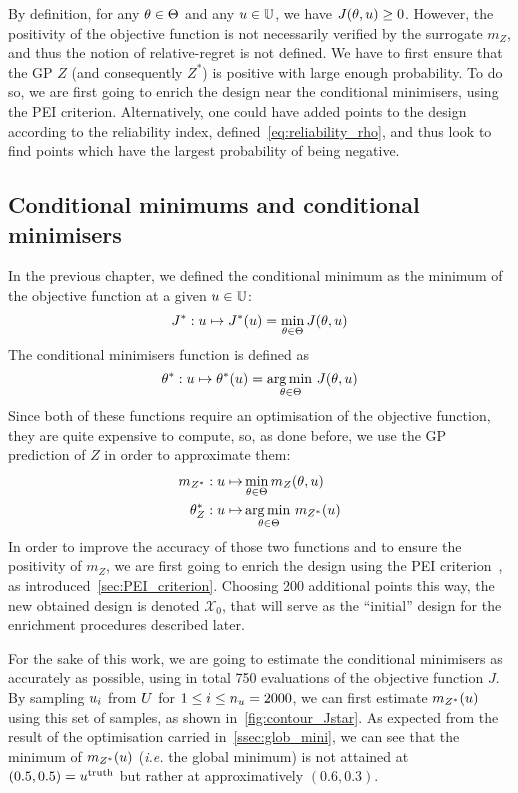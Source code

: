 \documentclass[../../Main_ManuscritThese.tex]{subfiles}
\begin{document}
By definition, for any $\theta\in \Theta$ and any $u \in \mathbb{U}$, we
have $J(\theta, u) \geq 0$.  However, the positivity of the objective
function is not necessarily verified by the surrogate $m_Z$, and thus
the notion of relative-regret is not defined. We have to first ensure
that the GP $Z$ (and consequently $Z^*$) is positive with large enough
probability.  To do so, we are first going to enrich the design near
the conditional minimisers, using the PEI criterion.  Alternatively,
one could have added points to the design according to the reliability
index, defined~\cref{eq:reliability_rho}, and thus look to find points
which have the largest probability of being negative.


\subsection{Conditional minimums and conditional minimisers}
\label{ssec:croco_cond_minimum_minimisers}

In the previous chapter, we defined the conditional minimum as the
minimum of the objective function at a given $u\in \mathbb{U}$:
\begin{equation}
  J^* : u \mapsto J^*(u) = \min_{\theta\in\Theta} J(\theta, u)
\end{equation}
The conditional minimisers function is defined as
\begin{equation}
  \theta^*:u  \mapsto \theta^*(u) = \operatorname*{arg\,min \,}_{\theta \in \Theta} J(\theta, u)
\end{equation}
Since both of these functions require an optimisation of the objective
function, they are quite expensive to compute, so, as done before, we
use the GP prediction of $Z$ in order to approximate them:
\begin{align}
  m_{Z^*}: u\mapsto &\min_{\theta \in \Theta} m_Z(\theta, u) \\
  \theta^*_{Z}: u  \mapsto &\operatorname*{arg\,min \,}_{\theta \in \Theta} m_{Z^*}(u)
\end{align}
In order to improve the accuracy of those two functions and to ensure
the positivity of $m_Z$, we are first going to enrich the design using
the PEI criterion~\citep{ginsbourger_bayesian_2014}, as
introduced~\cref{sec:PEI_criterion}.  Choosing \num{200}
additional points this way, the new obtained design is denoted
$\mathcal{X}_0$, that will serve as the ``initial'' design for the
enrichment procedures described later.

For the sake of this work, we are going to estimate the conditional
minimisers as accurately as possible, using in total \num{750}
evaluations of the objective function $J$. By sampling $u_i$ from
$U$ for $1\leq i \leq n_{u}=\num{2000}$, we can first estimate
$m_{Z^*}(u)$ using this set of samples, as shown
in~\cref{fig:contour_Jstar}. As expected from the result of the
optimisation carried in~\cref{ssec:glob_mini}, we can see that the
minimum of $m_{Z^*}(u)$ (\emph{i.e.} the global minimum) is not
attained at $(0.5, 0.5)=u^{\mathrm{truth}}$ but rather at
approximatively $(\num{0.6},\num{0.3})$.
\end{document}
